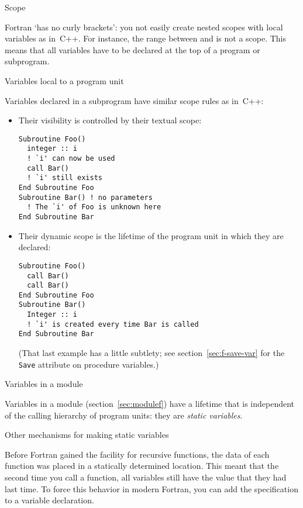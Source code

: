 
 {Scope}

Fortran `has no curly brackets': you not easily create nested
scopes with local variables as in~C++.
For instance, the range between  and  is not a scope.
This means that all variables have to be declared at the top of a
program or subprogram.

 {Variables local to a program unit}

Variables declared in a subprogram have similar scope rules as in~C++:
\begin{itemize}
\item Their visibility is controlled by their textual scope:
\begin{lstlisting}
Subroutine Foo()
  integer :: i
  ! `i' can now be used
  call Bar()
  ! `i' still exists
End Subroutine Foo
Subroutine Bar() ! no parameters
  ! The `i' of Foo is unknown here
End Subroutine Bar
\end{lstlisting}
\item Their dynamic scope is the lifetime of the program unit in which
  they are declared:
\begin{lstlisting}
Subroutine Foo()
  call Bar()
  call Bar()
End Subroutine Foo
Subroutine Bar()
  Integer :: i
  ! `i' is created every time Bar is called
End Subroutine Bar
\end{lstlisting}
(That last example has a little subtlety; see section~\ref{sec:f-save-var}
for the \lstinline{Save} attribute on procedure variables.)
\end{itemize}

 {Variables in a module}

Variables in a module (section~\ref{sec:modulef}) have a lifetime that
is independent of the calling hierarchy of program units: they are
\emph{static variables}.

 {Other mechanisms for making static variables}

Before Fortran gained the facility for recursive functions, the data
of each function was placed in a statically determined location. This
meant that the second time you call a function, all variables still
have the value that they had last time. To force this behavior
in modern Fortran, you can add the  specification
to a variable declaration.

